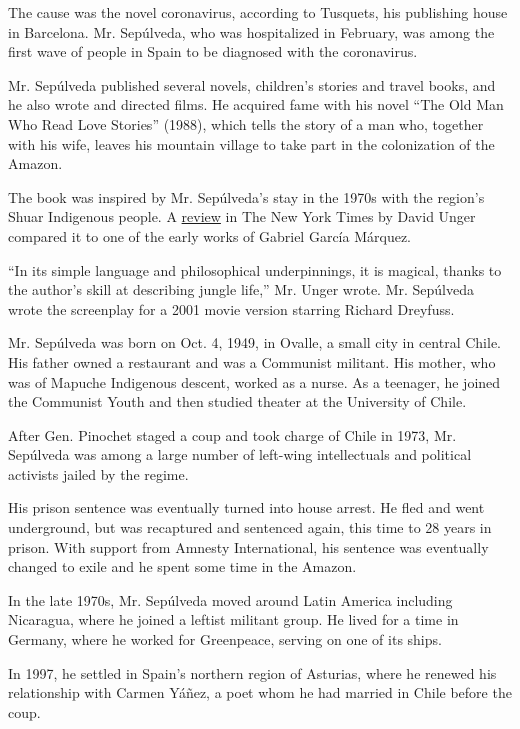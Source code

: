 The cause was the novel coronavirus, according to Tusquets, his
publishing house in Barcelona. Mr. Sepúlveda, who was hospitalized in
February, was among the first wave of people in Spain to be diagnosed
with the coronavirus.

Mr. Sepúlveda published several novels, children's stories and travel
books, and he also wrote and directed films. He acquired fame with his
novel ``The Old Man Who Read Love Stories'' (1988), which tells the
story of a man who, together with his wife, leaves his mountain village
to take part in the colonization of the Amazon.

The book was inspired by Mr. Sepúlveda's stay in the 1970s with the
region's Shuar Indigenous people. A
\href{https://www.nytimes3xbfgragh.onion/1994/05/01/books/flight-to-amazonia.html?searchResultPosition=5}{review}
in The New York Times by David Unger compared it to one of the early
works of Gabriel García Márquez.

``In its simple language and philosophical underpinnings, it is magical,
thanks to the author's skill at describing jungle life,'' Mr. Unger
wrote. Mr. Sepúlveda wrote the screenplay for a 2001 movie version
starring Richard Dreyfuss.

Mr. Sepúlveda was born on Oct. 4, 1949, in Ovalle, a small city in
central Chile. His father owned a restaurant and was a Communist
militant. His mother, who was of Mapuche Indigenous descent, worked as a
nurse. As a teenager, he joined the Communist Youth and then studied
theater at the University of Chile.

After Gen. Pinochet staged a coup and took charge of Chile in 1973, Mr.
Sepúlveda was among a large number of left-wing intellectuals and
political activists jailed by the regime.

His prison sentence was eventually turned into house arrest. He fled and
went underground, but was recaptured and sentenced again, this time to
28 years in prison. With support from Amnesty International, his
sentence was eventually changed to exile and he spent some time in the
Amazon.

In the late 1970s, Mr. Sepúlveda moved around Latin America including
Nicaragua, where he joined a leftist militant group. He lived for a time
in Germany, where he worked for Greenpeace, serving on one of its ships.

In 1997, he settled in Spain's northern region of Asturias, where he
renewed his relationship with Carmen Yáñez, a poet whom he had married
in Chile before the coup.

